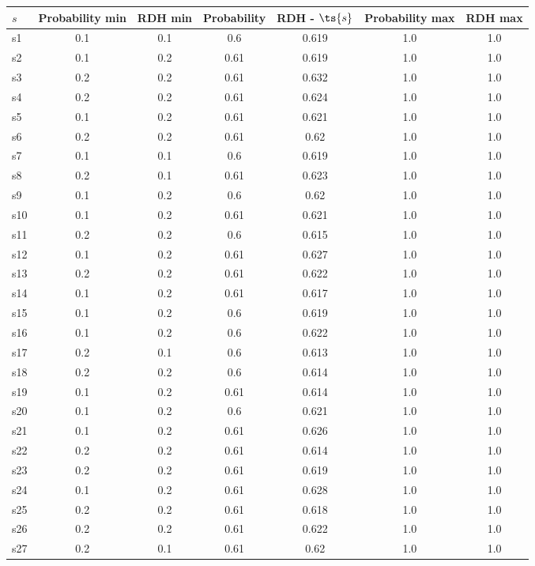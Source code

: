 \documentclass{article}
\begin{document}
\noindent\begin{tabular}{|l|c|c|c|c|c|c|}
\hline
$s$& Probability min & RDH min & Probability & RDH - $\ts{s}$ & Probability max & RDH max\\
\hline
s1 &0.1 & 0.1 & 0.6 & 0.619 & 1.0 & 1.0\\
\hline
s2 &0.1 & 0.2 & 0.61 & 0.619 & 1.0 & 1.0\\
\hline
s3 &0.2 & 0.2 & 0.61 & 0.632 & 1.0 & 1.0\\
\hline
s4 &0.2 & 0.2 & 0.61 & 0.624 & 1.0 & 1.0\\
\hline
s5 &0.1 & 0.2 & 0.61 & 0.621 & 1.0 & 1.0\\
\hline
s6 &0.2 & 0.2 & 0.61 & 0.62 & 1.0 & 1.0\\
\hline
s7 &0.1 & 0.1 & 0.6 & 0.619 & 1.0 & 1.0\\
\hline
s8 &0.2 & 0.1 & 0.61 & 0.623 & 1.0 & 1.0\\
\hline
s9 &0.1 & 0.2 & 0.6 & 0.62 & 1.0 & 1.0\\
\hline
s10 &0.1 & 0.2 & 0.61 & 0.621 & 1.0 & 1.0\\
\hline
s11 &0.2 & 0.2 & 0.6 & 0.615 & 1.0 & 1.0\\
\hline
s12 &0.1 & 0.2 & 0.61 & 0.627 & 1.0 & 1.0\\
\hline
s13 &0.2 & 0.2 & 0.61 & 0.622 & 1.0 & 1.0\\
\hline
s14 &0.1 & 0.2 & 0.61 & 0.617 & 1.0 & 1.0\\
\hline
s15 &0.1 & 0.2 & 0.6 & 0.619 & 1.0 & 1.0\\
\hline
s16 &0.1 & 0.2 & 0.6 & 0.622 & 1.0 & 1.0\\
\hline
s17 &0.2 & 0.1 & 0.6 & 0.613 & 1.0 & 1.0\\
\hline
s18 &0.2 & 0.2 & 0.6 & 0.614 & 1.0 & 1.0\\
\hline
s19 &0.1 & 0.2 & 0.61 & 0.614 & 1.0 & 1.0\\
\hline
s20 &0.1 & 0.2 & 0.6 & 0.621 & 1.0 & 1.0\\
\hline
s21 &0.1 & 0.2 & 0.61 & 0.626 & 1.0 & 1.0\\
\hline
s22 &0.2 & 0.2 & 0.61 & 0.614 & 1.0 & 1.0\\
\hline
s23 &0.2 & 0.2 & 0.61 & 0.619 & 1.0 & 1.0\\
\hline
s24 &0.1 & 0.2 & 0.61 & 0.628 & 1.0 & 1.0\\
\hline
s25 &0.2 & 0.2 & 0.61 & 0.618 & 1.0 & 1.0\\
\hline
s26 &0.2 & 0.2 & 0.61 & 0.622 & 1.0 & 1.0\\
\hline
s27 &0.2 & 0.1 & 0.61 & 0.62 & 1.0 & 1.0\\

\end{tabular}
\end{document}
